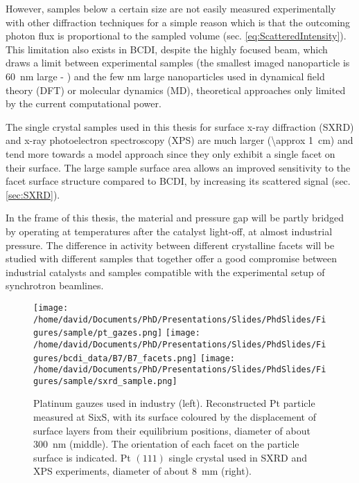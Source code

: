 However, samples below a certain size are not easily measured experimentally with other diffraction techniques for a simple reason which is that the outcoming photon flux is proportional to the sampled volume (sec. \ref{eq:ScatteredIntensity}).
This limitation also exists in BCDI, despite the highly focused beam, which draws a limit between experimental samples (the smallest imaged nanoparticle is \qty{60}{\nm} large - \cite{Bjorling2019, Carnis2021}) and the few \unit{\nm} large nanoparticles used in dynamical field theory (DFT) or molecular dynamics (MD), theoretical approaches only limited by the current computational power.

The single crystal samples used in this thesis for surface x-ray diffraction (SXRD) and x-ray photoelectron spectroscopy (XPS) are much larger (\qty{\approx 1}{\cm}) and tend more towards a model approach since they only exhibit a single facet on their surface.
The large sample surface area allows an improved sensitivity to the facet surface structure compared to BCDI, by increasing its scattered signal (sec. \ref{sec:SXRD}).


In the frame of this thesis, the material and pressure gap will be partly bridged by operating at temperatures after the catalyst light-off, at almost industrial pressure.
The difference in activity between different crystalline facets will be studied with different samples that together offer a good compromise between industrial catalysts and samples compatible with the experimental setup of synchrotron beamlines.

\begin{figure}[!htb]
    \centering
    \texttt{[image: /home/david/Documents/PhD/Presentations/Slides/PhdSlides/Figures/sample/pt\_gazes.png]}
    \texttt{[image: /home/david/Documents/PhD/Presentations/Slides/PhdSlides/Figures/bcdi\_data/B7/B7\_facets.png]}
    \texttt{[image: /home/david/Documents/PhD/Presentations/Slides/PhdSlides/Figures/sample/sxrd\_sample.png]}
    \caption{
    Platinum gauzes used in industry (left).
    Reconstructed Pt particle measured at SixS, with its surface coloured by the displacement of surface layers from their equilibrium positions, diameter of about \qty{300}{\nm} (middle).
    The orientation of each facet on the particle surface is indicated.
    Pt $(111)$ single crystal used in SXRD and XPS experiments, diameter of about \qty{8}{\mm} (right).
    }
\end{figure}

